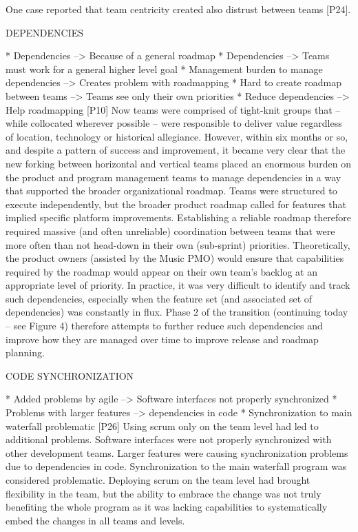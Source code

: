 \documentclass[preprint,authoryear,12pt]{elsarticle}
\begin{document}
One case reported that team centricity created also distrust between teams [P24].




DEPENDENCIES

* Dependencies --> Because of a general roadmap
* Dependencies --> Teams must work for a general higher level goal
* Management burden to manage dependencies --> Creates problem with roadmapping
* Hard to create roadmap between teams --> Teams see only their own priorities
* Reduce dependencies --> Help roadmapping
[P10]
Now teams were comprised of tight-knit groups that – while collocated wherever
possible – were responsible to deliver value regardless of location, technology
or historical allegiance.
However, within six months or so, and despite a pattern of success and
improvement, it became very clear that the new forking between horizontal and
vertical teams placed an enormous burden on the product and program management
teams to manage dependencies in a way that supported the broader organizational
roadmap. Teams were structured to execute independently, but the broader product
roadmap called for features that implied specific platform improvements.
Establishing a reliable roadmap therefore required massive (and often
unreliable) coordination between teams that were more often than not head-down
in their own (sub-sprint) priorities.
Theoretically, the product owners (assisted by the Music PMO) would ensure that
capabilities required by the roadmap would appear on their own team’s backlog at
an appropriate level of priority. In practice, it was very difficult to identify
and track such dependencies, especially when the feature set (and associated set
of dependencies) was constantly in flux.
Phase 2 of the transition (continuing today – see Figure 4) therefore attempts
to further reduce such dependencies and improve how they are managed over time
to improve release and roadmap planning.



CODE SYNCHRONIZATION

* Added problems by agile --> Software interfaces not properly synchronized
* Problems with larger features --> dependencies in code
* Synchronization to main waterfall problematic
[P26]
Using scrum only on the team level had led to additional problems. Software
interfaces were not properly synchronized with other development teams.
Larger features were causing synchronization problems due to dependencies in
code. Synchronization to the main waterfall program was considered problematic.
Deploying scrum on the team level had brought flexibility in the team, but the
ability to embrace the change was not truly benefiting the whole program as it
was lacking capabilities to systematically embed the changes in all teams and
levels.
\end{document}
